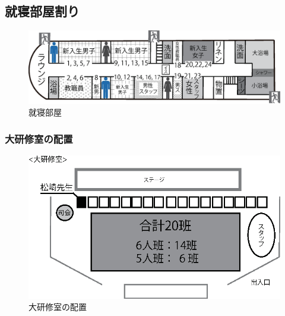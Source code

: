 \subsection{就寝部屋割り}
\begin{figure}[H]
\begin{center}
\includegraphics[scale=0.5]{./10/syushin.eps}
\vspace{-30mm}
\caption{就寝部屋}
\label{fig:shushin}
\end{center}
\end{figure}

\subsubsection{大研修室の配置}
\begin{figure}[H]
 \begin{center}
  \includegraphics[width=130mm]{./03/nyushoshiki.eps}
  \end{center}
 \caption{大研修室の配置}
 \label{fig:daikenshuhaichi}
\end{figure}

